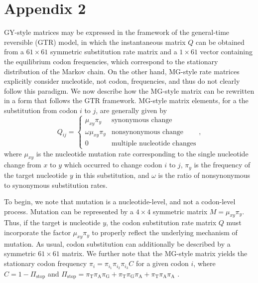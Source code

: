 \documentclass[11pt]{article}
\begin{document}
\section*{Appendix 2}
GY-style matrices may be expressed in the framework of the general-time reversible (GTR) model, in which the instantaneous matrix $Q$ can be obtained from a $61 \times 61$ symmetric substitution rate matrix and a $1\times61$ vector containing the equilibrium codon frequencies, which correspond to the stationary distribution of the Markov chain. On the other hand, MG-style rate matrices explicitly consider nucleotide, not codon, frequencies, and thus do not clearly follow this paradigm. We now describe how the MG-style matrix can be rewritten in a form that follows the GTR framework. 
MG-style matrix elements, for a the substitution from codon $i$ to $j$, are generally given by 
\begin{equation}\label{eq:MGstyle}
Q_{ij} = \left\{ 
\begin{array}{rl}
\mu_{xy}\pi_{y}        &\mbox{synonymous change} \\
\omega\mu_{xy}\pi_{y}    &\mbox{nonsynonymous change} \\
0                           &\mbox{multiple nucleotide changes}       
\end{array} \right. ,
\end{equation} where $\mu_{xy}$ is the nucleotide mutation rate corresponding to the single nucleotide change from $x$ to $y$ which occurred to change codon $i$ to $j$, $\pi_{y}$ is the frequency of the target nucleotide $y$ in this substitution, and $\omega$ is the ratio of nonsynonymous to synonymous substitution rates.

To begin, we note that mutation is a nucleotide-level, and not a codon-level process. Mutation can be represented by a $4 \times 4$ symmetric matrix $M = \mu_{xy}\pi_y$. Thus, if the target is nucleotide $y$, the codon substitution rate matrix $Q$ must incorporate the factor $\mu_{xy}\pi_y$ to properly reflect the underlying mechanism of mutation. As usual, codon substitution can additionally be described by a symmetric $61\times61$ matrix. We further note that the MG-style matrix yields the stationary codon frequency $\pi_i = \pi_{i_1}\pi_{i_2}\pi_{i_3}C$ for a given codon $i$, where $C = 1 - \Pi_\text{stop}$ and $\Pi_\text{stop} = \pi_\text{T}\pi_\text{A}\pi_\text{G} + \pi_\text{T}\pi_\text{G}\pi_\text{A} + \pi_\text{T}\pi_\text{A}\pi_\text{A}$ \cite{MuseGaut1994}. 
\end{document}

